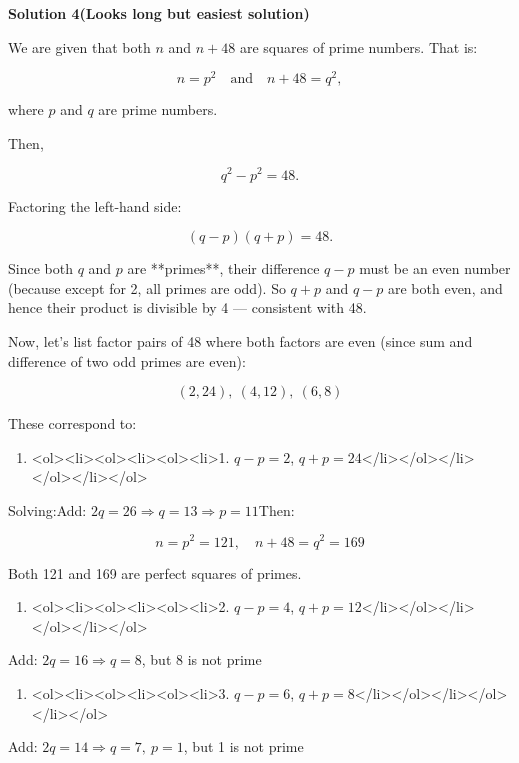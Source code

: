 \begin{enumerate}
 



\textbf{Solution 4(Looks long but easiest solution)}

We are given that both $n$ and $n + 48$ are squares of prime numbers. That is:

 
 \[n = p^2 \quad \text{and} \quad n + 48 = q^2,\]

 where $p$ and $q$ are prime numbers.

 Then,

 
 \[q^2 - p^2 = 48.\]

 Factoring the left-hand side:

 
 \[(q - p)(q + p) = 48.\]

 Since both $q$ and $p$ are **primes**, their difference $q - p$ must be an even number (because except for 2, all primes are odd). So $q + p$ and $q - p$ are both even, and hence their product is divisible by 4 — consistent with 48.

 Now, let’s list factor pairs of 48 where both factors are even (since sum and difference of two odd primes are even):

 
 \[(2, 24),\ (4, 12),\ (6, 8)\]

 These correspond to:

 
            \begin{enumerate}
        \item <ol><li><ol><li><ol><li>1. $q - p = 2$, $q + p = 24$</li></ol></li></ol></li></ol>
            \end{enumerate}
            Solving:Add: $2q = 26 \Rightarrow q = 13 \Rightarrow p = 11$Then:

 
 \[n = p^2 = 121,\quad n + 48 = q^2 = 169\]

 Both 121 and 169 are perfect squares of primes.

 
            \begin{enumerate}
        \item <ol><li><ol><li><ol><li>2. $q - p = 4$, $q + p = 12$</li></ol></li></ol></li></ol>
            \end{enumerate}
            Add: $2q = 16 \Rightarrow q = 8$, but 8 is not prime 

 
            \begin{enumerate}
        \item <ol><li><ol><li><ol><li>3. $q - p = 6$, $q + p = 8$</li></ol></li></ol></li></ol>
            \end{enumerate}
            Add: $2q = 14 \Rightarrow q = 7,\ p = 1$, but 1 is not prime


\end{enumerate}
